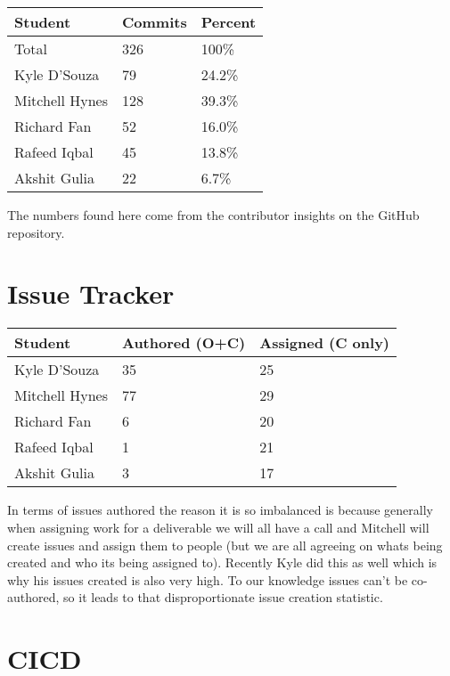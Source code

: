 \documentclass{article}
\begin{document}
\begin{table}[H]
  \centering
  \begin{tabular}{lll}
    \toprule
    \textbf{Student} & \textbf{Commits} & \textbf{Percent}\\
    \midrule
    Total & 326 & 100\% \\
    Kyle D'Souza & 79 & 24.2\% \\
    Mitchell Hynes & 128 & 39.3\% \\
    Richard Fan & 52 & 16.0\% \\
    Rafeed Iqbal & 45 & 13.8\% \\
    Akshit Gulia & 22 & 6.7\% \\
    \bottomrule
  \end{tabular}
\end{table}

The numbers found here come from the contributor insights on the
GitHub repository.

\section{Issue Tracker}

\begin{table}[H]
  \centering
  \begin{tabular}{lll}
    \toprule
    \textbf{Student} & \textbf{Authored (O+C)} & \textbf{Assigned (C only)}\\
    \midrule
    Kyle D'Souza & 35 & 25 \\
    Mitchell Hynes & 77 & 29 \\
    Richard Fan & 6 & 20 \\
    Rafeed Iqbal & 1 & 21 \\
    Akshit Gulia & 3 & 17 \\
    \bottomrule
  \end{tabular}
\end{table}

In terms of issues authored the reason it is so imbalanced is because
generally when assigning work for a deliverable we will all have a
call and Mitchell will create issues and assign them to people (but
  we are all agreeing on whats being created and who its being assigned
to). Recently Kyle did this as well which is why his issues created
is also very high. To our knowledge issues can't be co-authored, so
it leads to that disproportionate issue creation statistic.

\section{CICD}
\end{document}

